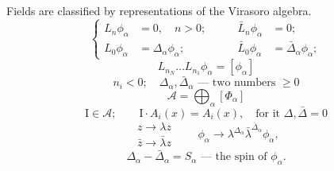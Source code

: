 Fields are classified by representations of the Virasoro algebra.
\begin{equation*}
\left\{\begin{aligned}
L_n\phi_\alpha&=0,\quad n>0;&\qquad\bar L_n\phi_\alpha&=0;\\
L_0\phi_\alpha&=\Delta_\alpha\phi_\alpha;&\qquad
\bar L_0\phi_\alpha&=\bar\Delta_\alpha\phi_\alpha;
\end{aligned}\right.
\tag{26}
\end{equation*}
\begin{equation*}
L_{n_N}\ldots L_{n_1}\phi_\alpha=[\phi_\alpha]
\end{equation*}
\begin{equation*}
n_i<0;\quad\Delta_\alpha,\bar\Delta_\alpha\text{ --- two numbers }\geq0
\end{equation*}
\begin{equation*}
\mathcal A=\bigoplus_\alpha[\Phi_\alpha]
\end{equation*}
\begin{equation*}
\mathrm I\in\mathcal A;\qquad\mathrm I\cdot A_i(x)=A_i(x),\quad
\text{for it }\Delta,\bar\Delta=0
\end{equation*}
\begin{equation*}
\begin{gathered}
z\to\lambda z\\
\bar z\to\bar\lambda z
\end{gathered}
\qquad\phi_\alpha\to\lambda^{\Delta_\alpha}\bar\lambda^{\bar\Delta_\alpha}\phi_\alpha,
\end{equation*}
\begin{equation*}
\Delta_\alpha-\bar\Delta_\alpha=S_\alpha\text{ --- the spin of }\phi_\alpha.
\end{equation*}

